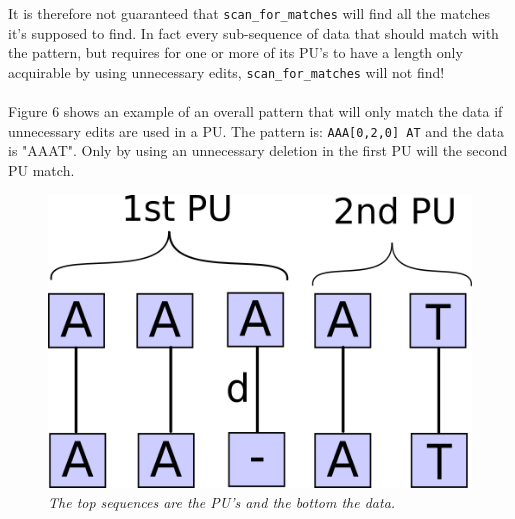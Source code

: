 \documentclass[12pt]{article}
\newcommand{\scm}{\texttt{scan\_for\_matches} }
\newcommand{\pu}{PU }
\newcommand{\pus}{PU's }
\newcommand{\pup}{PU. }
\begin{document}
It is therefore not guaranteed that \scm will find all the matches it's supposed to find. In fact every sub-sequence
of data that should match with the pattern, but requires for one or more of its \pus to have a length only
acquirable by using unnecessary edits, \scm will not find! \\ \\
Figure 6 shows an example of an overall pattern that will only match the data if unnecessary edits are used in a \pup
The pattern is: \texttt{AAA[0,2,0] AT} and the data is "AAAT". Only by using an unnecessary deletion in the first
\pu will the second \pu match.
\begin{figure}[H]
\begin{center}
\includegraphics[scale=0.3]{Diagrams/scnfail.png}
\end{center}
\caption{\textit{The top sequences are the \pus and the bottom the data.}}
\end{figure}
\end{document}
